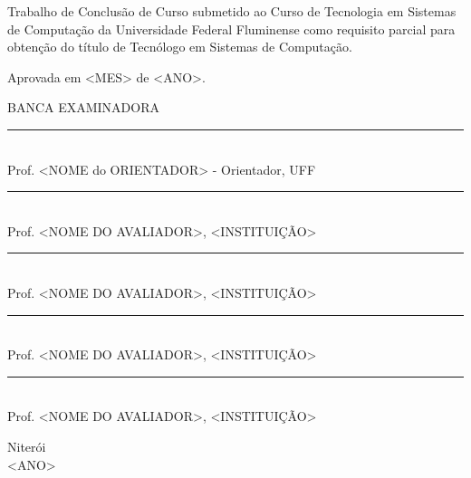 \noindent
\begin{flushright}
\begin{minipage}[t]{8cm}

  Trabalho de Conclus\~ao de Curso submetido ao Curso de Tecnologia em Sistemas de Computa\c{c}\~ao da Universidade Federal Fluminense como requisito parcial para obten\c{c}\~ao do t\'itulo de Tecn\'ologo em Sistemas de Computa\c{c}\~ao. %

\end{minipage}
\end{flushright}
\vspace{1.0 cm}
Aprovada em <MES> de <ANO>. \\
\begin{flushright}
  \parbox{11cm}
  {
  \begin{center}
  BANCA EXAMINADORA \\
  \vspace{6mm}
  \rule{11cm}{.1mm} \\
    Prof. <NOME do ORIENTADOR> - Orientador, UFF \\
    \vspace{6mm}
  \rule{11cm}{.1mm} \\
    Prof. <NOME DO AVALIADOR>, <INSTITUI\c{C}\~AO>\\
    \vspace{6mm}
  \rule{11cm}{.1mm} \\
    Prof. <NOME DO AVALIADOR>, <INSTITUI\c{C}\~AO>\\
  \vspace{4mm}
  \rule{11cm}{.1mm} \\
    Prof. <NOME DO AVALIADOR>, <INSTITUI\c{C}\~AO>\\
    \vspace{6mm}
  \rule{11cm}{.1mm} \\
    Prof. <NOME DO AVALIADOR>, <INSTITUI\c{C}\~AO>\\
  \vspace{6mm}
  \end{center}
  }
\end{flushright}
\begin{center}
  \vspace{4mm}
  Niter\'{o}i \\
  <ANO>

\end{center}

\cleardoublepage
\thispagestyle{empty}
\vspace*{200mm}

